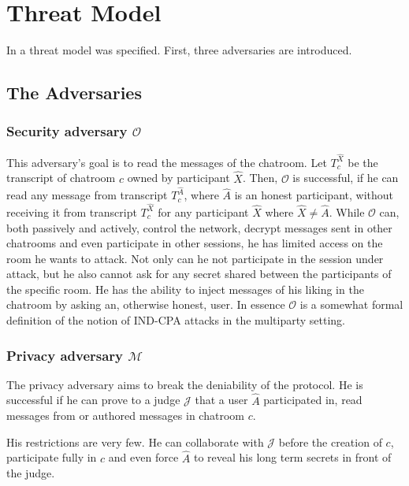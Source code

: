 \chapter{Threat Model}
\label{chapters:ThreatModel}

\newcommand{\secadv}{$\mathcal{O}$ }
\newcommand{\privadv}{$\mathcal{M}$ }

In \cite{mpotr} a threat model was specified. First, three adversaries are introduced.

\section{The Adversaries}

\subsection{Security adversary $\mathcal{O}$}
This adversary's goal is to read the messages of the chatroom.
Let $T_c^{\hat{X}}$ be the transcript of chatroom $c$ owned by participant $\hat{X}$.
Then, $\mathcal{O}$ is successful, if he can read any message from transcript $T_c^{\hat{A}}$, where $\hat{A}$ is an honest participant, without receiving it from transcript $T_c^{\hat{X}}$ for any participant $\hat{X}$ where $\hat{X} \ne \hat{A}$.
While $\mathcal{O}$ can, both passively and actively, control the network, decrypt messages sent in other chatrooms and even participate in other sessions, he has limited access on the room he wants to attack.
Not only can he not participate in the session under attack, but he also cannot ask for any secret shared between the participants of the specific room.
He has the ability to inject messages of his liking in the chatroom by asking an, otherwise honest, user.
In essence $\mathcal{O}$ is a somewhat formal definition of the notion of IND-CPA attacks in the multiparty setting.

\subsection{Privacy adversary $\mathcal{M}$}

The privacy adversary aims to break the deniability of the protocol.
He is successful if he can prove to a judge $\mathcal{J}$ that a user $\hat{A}$ participated in, read messages from or authored messages in chatroom $c$.

His restrictions are very few.
He can collaborate with $\mathcal{J}$ before the creation of $c$, participate fully in $c$ and even force $\hat{A}$ to reveal his long term secrets in front of the judge.

